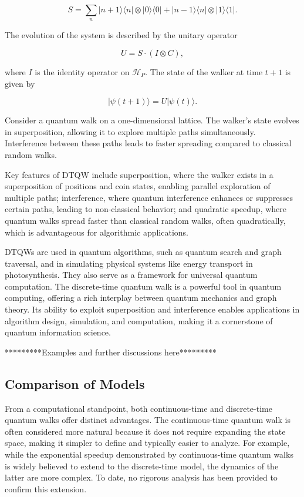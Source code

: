 \documentclass[11pt]{article}
\theoremstyle{definition}
\begin{document}
\[
S = \sum_{n} |n+1\rangle \langle n| \otimes |0\rangle \langle 0| + |n-1\rangle \langle n| \otimes |1\rangle \langle 1|.
\]

The evolution of the system is described by the unitary operator 

\[
U = S \cdot (I \otimes C),
\]

where \( I \) is the identity operator on \( \mathcal{H}_P \). The state of the walker at time \( t+1 \) is given by 

\[
|\psi(t+1)\rangle = U |\psi(t)\rangle.
\]

Consider a quantum walk on a one-dimensional lattice. The walker's state evolves in superposition, allowing it to explore multiple paths simultaneously. Interference between these paths leads to faster spreading compared to classical random walks.

Key features of DTQW include superposition, where the walker exists in a superposition of positions and coin states, enabling parallel exploration of multiple paths; interference, where quantum interference enhances or suppresses certain paths, leading to non-classical behavior; and quadratic speedup, where quantum walks spread faster than classical random walks, often quadratically, which is advantageous for algorithmic applications.

DTQWs are used in quantum algorithms, such as quantum search and graph traversal, and in simulating physical systems like energy transport in photosynthesis. They also serve as a framework for universal quantum computation. The discrete-time quantum walk is a powerful tool in quantum computing, offering a rich interplay between quantum mechanics and graph theory. Its ability to exploit superposition and interference enables applications in algorithm design, simulation, and computation, making it a cornerstone of quantum information science.

*********Examples and further discussions here*********


\subsection*{Comparison of Models}

From a computational standpoint, both continuous-time and discrete-time quantum walks offer distinct advantages. The continuous-time quantum walk is often considered more natural because it does not require expanding the state space, making it simpler to define and typically easier to analyze. For example, while the exponential speedup demonstrated by continuous-time quantum walks is widely believed to extend to the discrete-time model, the dynamics of the latter are more complex. To date, no rigorous analysis has been provided to confirm this extension.
\end{document}
